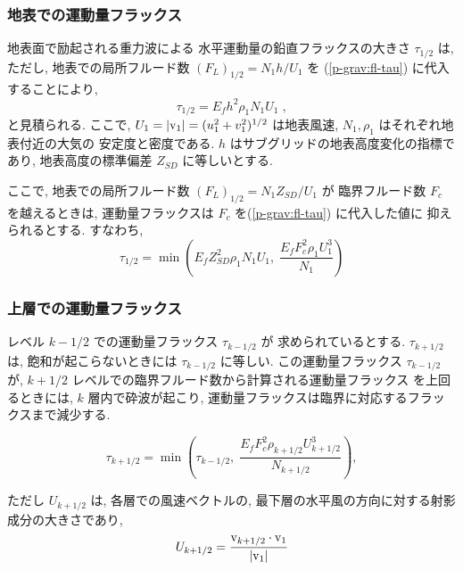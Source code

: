 \subsubsection{地表での運動量フラックス}

地表面で励起される重力波による
水平運動量の鉛直フラックスの大きさ $\tau_{1/2}$ は,
ただし, 地表での局所フルード数 
$(F_L)_{1/2} = N_1 h/U_1$ を
(\ref{p-grav:fl-tau}) に代入することにより,
%
\begin{equation}
  \tau_{1/2} = E_f h^2 \rho_1 N_1 U_1 \; ,
\end{equation}
%
と見積られる.
ここで, 
$U_1 = |\mbox{\boldmath v}_1| = (u_1^2 + v_1^2)^{1/2}$ は地表風速,
$N_1, \rho_1$ はそれぞれ地表付近の大気の
安定度と密度である.
$h$ はサブグリッドの地表高度変化の指標であり,
地表高度の標準偏差 $Z_{SD}$ に等しいとする.

ここで, 地表での局所フルード数 
$(F_L)_{1/2} = N_1 Z_{SD}/U_1$ が 臨界フルード数
$F_c$ を越えるときは, 
運動量フラックスは $F_c$ を(\ref{p-grav:fl-tau}) に代入した値に
抑えられるとする.
すなわち,
\begin{equation}
  \tau_{1/2} = \min \left(
                   E_f Z_{SD}^{2} \rho_1 N_1 U_1, \; 
                  \frac{E_f F_c^{2} \rho_1 U_1^3}{N_1}
               \right)
\end{equation}

\subsubsection{上層での運動量フラックス}

レベル $k-1/2$ での運動量フラックス $\tau_{k-1/2}$ が
求められているとする.
$\tau_{k+1/2}$ は, 飽和が起こらないときには
$\tau_{k-1/2}$ に等しい.
この運動量フラックス $\tau_{k-1/2}$ が,
$k+1/2$ レベルでの臨界フルード数から計算される運動量フラックス
を上回るときには, $k$ 層内で砕波が起こり,
運動量フラックスは臨界に対応するフラックスまで減少する.

\begin{equation}
  \tau_{k+1/2} = \min \left( 
               \tau_{k-1/2}, \;
               \frac{E_f F_c^2 \rho_{k+1/2} U_{k+1/2}^3}{N_{k+1/2}}
                      \right),
\end{equation}

ただし $U_{k+1/2}$ は,
各層での風速ベクトルの,
最下層の水平風の方向に対する射影成分の大きさであり,
\begin{equation}
  U_{k+1/2} = \frac{\mbox{\boldmath v}_{k+1/2} 
                      \cdot \mbox{\boldmath v}_{1}}
                   {|\mbox{\boldmath v}_{1}|       }
\end{equation}

